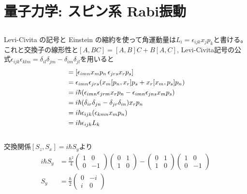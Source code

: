 \documentclass[../../master.tex]{subfiles}
\begin{document}
\section{量子力学: スピン系 Rabi振動}
\subsection{}
Levi-Civita の記号と Einstein の縮約を使って角運動量は\(L_i = \epsilon_{ijk}x_jp_k\)と書ける。
これと交換子の線形性と\([A,BC]=[A,B]C+B[A,C]\),
Levi-Civita記号の公式\(\epsilon_{ijk}\epsilon_{klm}=\delta_{il}\delta_{jm}-\delta_{im}\delta_{jl}\)を用いると
\begin{align}
    [L_i,\,L_j]
    &=[\epsilon_{imn}x_mp_n\,\epsilon_{jrs}x_rp_s]\\
    &=\epsilon_{imn}\epsilon_{jrs}\qty(x_m[p_n,x_r]p_s+x_r[x_m,p_s]p_n)\\
    &=i\hbar\qty(\epsilon_{imn}\epsilon_{jrm}x_rp_n-\epsilon_{imn}\epsilon_{jns}x_m p_s)\\
    &=i\hbar\qty(\delta_{ir}\delta_{jn}-\delta_{jr}\delta_{in})x_rp_n\\
    &=i\hbar\epsilon_{ijk}(\epsilon_{kmn}x_mp_n)\\
    &=i\hbar\epsilon_{ijk}L_k
\end{align}

\subsection{}
交換関係\([S_z,S_x]=i\hbar S_y\)より
\begin{align}
    i\hbar S_y
    &= \frac{\hbar^2}{4}\begin{pmatrix}
        1 & 0\\
        0 & -1
    \end{pmatrix}
    \begin{pmatrix}
        0 & 1\\
        1 & 0
    \end{pmatrix}-
    \begin{pmatrix}
        0 & 1\\
        1 & 0
    \end{pmatrix}
    \begin{pmatrix}
        1 & 0\\
        0 & -1
    \end{pmatrix}\\
    S_y &= \frac{\hbar}{2}\begin{pmatrix}
        0 &-i\\
        i & 0
    \end{pmatrix}
\end{align}
\end{document}
